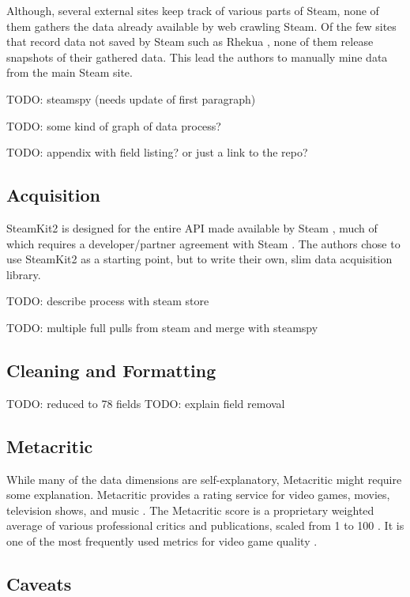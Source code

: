 \documentclass[letterpaper,10pt,twocolumn]{article}
\begin{document}
Although, several external sites keep track of various parts of Steam, none of
them gathers the data already available by web crawling Steam. Of the few
sites that record data not saved by Steam such as Rhekua \cite{rhekua}, none
of them release snapshots of their gathered data. This lead the authors to
manually mine data from the main Steam site.

TODO: steamspy (needs update of first paragraph)

TODO: some kind of graph of data process?

TODO: appendix with field listing? or just a link to the repo?

\subsection{Acquisition}

SteamKit2 is designed for the entire API made available by Steam
\cite{steamkit}, much of which requires a developer/partner agreement with
Steam \cite{steam-dev}. The authors chose to use SteamKit2 as a starting point,
but to write their own, slim data acquisition library.

TODO: describe process with steam store

TODO: multiple full pulls from steam and merge with steamspy

\subsection{Cleaning and Formatting}

TODO: reduced to 78 fields
TODO: explain field removal

\subsection{Metacritic}

While many of the data dimensions are self-explanatory, Metacritic might
require some explanation. Metacritic provides a rating service for video
games, movies, television shows, and music \cite{metacritic}. The Metacritic
score is a proprietary weighted average of various professional critics and
publications, scaled from 1 to 100 \cite{metacritic-score}. It is one of the
most frequently used metrics for video game quality \cite{metacritic-vgdominant}.


\subsection{Caveats}
\end{document}
